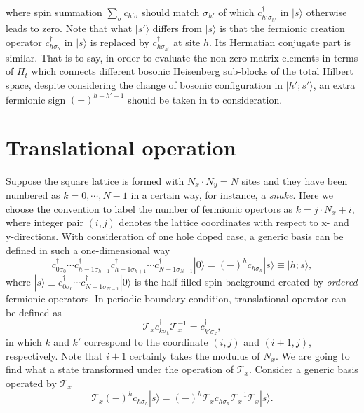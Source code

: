 \documentclass[eprint]{article} %
\begin{document}
where spin summation $\sum_{\sigma}c_{h{'\sigma}}$ should match $\sigma_{h{'}}$ of which $c_{h{'}\sigma_{h{'}}}^{\dagger}$ in $|s\rangle$ otherwise leads to zero. Note that what $|s{'}\rangle$ differs from $|s\rangle$ is that the fermionic creation operator $c_{h\sigma_{h}}^{\dagger}$ in $|s\rangle$ is replaced by $c_{h\sigma_{h{'}}}^{\dagger}$ at site $h$. Its Hermatian conjugate part is similar. That is to say, in order to evaluate the non-zero matrix elements in terms of $H_{t}$ which connects different bosonic Heisenberg sub-blocks of the total Hilbert space, despite considering the change of bosonic configuration in $|h{'}; s{'\rangle}$, an extra fermionic sign $(-)^{h-h{'}+1}$ should be taken in to consideration.


\section{Translational operation}
Suppose the square lattice is formed with $N_{x}\cdot{N}_{y}=N$ sites and they have been numbered as $k=0, \cdots, N-1$ in a certain way, for instance, a \emph{snake}. Here we choose the convention to label the number of fermionic opertors as $k=j\cdot{N_{x}}+i$, where integer pair $(i, j)$ denotes the lattice coordinates with respect to x- and y-directions. With consideration of one hole doped case, a generic basis can be defined in such a one-dimensional way
\begin{equation}
    c_{0\sigma_{0}}^{\dagger}\cdots{c}_{h-1\sigma_{h-1}}^{\dagger}c_{h+1\sigma_{h+1}}^{\dagger}\cdots{c}_{N-1\sigma_{N-1}}^{\dagger}|0\rangle=(-)^{h}c_{h\sigma_{h}}|s\rangle\equiv|h; s\rangle,
    \label{}
\end{equation}
where $|s\rangle\equiv{c}_{0\sigma_{0}}^{\dagger}\cdots{c}_{N-1\sigma_{N-1}}^{\dagger}|0\rangle$ is the half-filled spin background created by \emph{ordered} fermionic operators. In periodic boundary condition, translational operator can be defined as
\begin{equation}
    \mathcal{T}_{x}c_{k\sigma_{k}}^{\dagger}\mathcal{T}_{x}^{-1}=c_{k{'}\sigma_{k}}^{\dagger},
    \label{}
\end{equation}
in which $k$ and $k{'}$ correspond to the coordinate $(i, j)$ and $(i+1, j)$, respectively. Note that $i+1$ certainly takes the modulus of $N_{x}$. We are going to find what a state transformed under the operation of $\mathcal{T}_{x}$. Consider a generic basis operated by $\mathcal{T}_{x}$
\begin{equation}
    \mathcal{T}_{x}(-)^{h}c_{h\sigma_{h}}|s\rangle=(-)^{h}\mathcal{T}_{x}c_{h\sigma_{h}}\mathcal{T}_{x}^{-1}\mathcal{T}_{x}|s\rangle.
    \label{<+label+>}
\end{equation}
\end{document}
